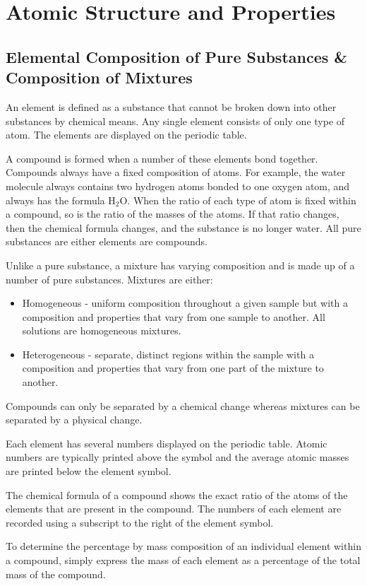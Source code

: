 \documentclass[../chem.tex]{subfiles}
\begin{document}
\chapter{Atomic Structure and Properties}
\section{Elemental Composition of Pure Substances \& Composition of Mixtures}
An element is defined as a substance that cannot be broken down into other substances by chemical means.
Any single element consists of only one type of atom. The elements are displayed on the periodic table.

A compound is formed when a number of these elements bond together. Compounds always have a fixed composition of atoms. 
For example, the water molecule always contains two hydrogen atoms bonded to one oxygen atom, and always has the formula H$_2$O.
When the ratio of each type of atom is fixed within a compound, so is the ratio of the masses of the atoms. If that ratio changes,
then the chemical formula changes, and the substance is no longer water. All pure substances are either elements are compounds.

Unlike a pure substance, a mixture has varying composition and is made up of a number of pure substances.
Mixtures are either:
\begin{itemize}
    \item Homogeneous - uniform composition throughout a given sample but with a composition and properties that vary from one sample to another. All solutions are homogeneous mixtures.
    \item Heterogeneous - separate, distinct regions within the sample with a composition and properties that vary from one part of the mixture to another. 
\end{itemize}

Compounds can only be separated by a chemical change whereas mixtures can be separated by a physical change.

Each element has several numbers displayed on the periodic table. Atomic numbers are typically printed above the symbol and the average atomic masses are printed below the element symbol.

The chemical formula of a compound shows the exact ratio of the atoms of the elements that are present in the compound. 
The numbers of each element are recorded using a subscript to the right of the element symbol.

To determine the percentage by mass composition of an individual element within a compound, simply express the mass of each element as a percentage of the total mass of the compound.
\end{document}
